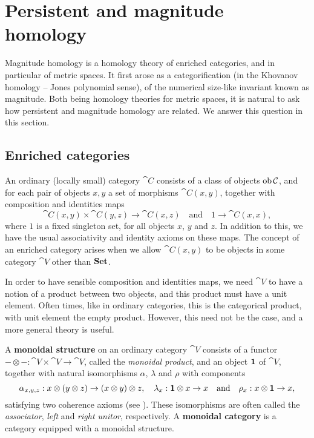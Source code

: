 \section{Persistent and magnitude homology}
Magnitude homology is a homology theory of enriched categories, and in particular of metric spaces. It first arose as a categorification (in the Khovanov homology -- Jones polynomial sense), of the numerical size-like invariant known as magnitude. Both being homology theories for metric spaces, it is natural to ask how persistent and magnitude homology are related. We answer this question in this section.

\subsection{Enriched categories}
An ordinary (locally small) category $\cat{C}$ consists of a class of objects $\operatorname{ob}\mathcal{C}$, and for each pair of objects $x,y$ a set of morphisms $\cat{C}(x,y)$, together with composition and identities maps
\[\cat{C}(x,y) \times \cat{C}(y,z) \to \cat{C}(x,z) \quad \text{and} \quad 1 \to \cat{C}(x,x),\]
where $1$ is a fixed singleton set, for all objects $x$, $y$ and $z$. In addition to this, we have the usual associativity and identity axioms on these maps. The concept of an enriched category arises when we allow $\cat{C}(x,y)$ to be objects in some category $\cat{V}$ other than $\mathbf{Set}$.

In order to have sensible composition and identities maps, we need $\cat{V}$ to have a notion of a product between two objects, and this product must have a unit element. Often times, like in ordinary categories, this is the categorical product, with unit element the empty product. However, this need not be the case, and a more general theory is useful. 
\begin{definition}
    A \textbf{monoidal structure} on an ordinary category $\cat{V}$ consists of a functor $- \otimes - : \cat{V} \times \cat{V} \to \cat{V}$, called the \textit{monoidal product}, and an object $\mathbf{1}$ of $\cat{V}$, together with natural isomorphisms $\alpha$, $\lambda$ and $\rho$ with components
    \[\alpha_{x,y,z} : x \otimes (y \otimes z) \to (x \otimes y) \otimes z, \quad \lambda_x : \mathbf{1} \otimes x \to x \quad \text{and} \quad \rho_x : x \otimes \mathbf{1} \to x,\]
    satisfying two coherence axioms (see \cite[Chapter VII]{MacLane1978}). These isomorphisms are often called the \textit{associator}, \textit{left} and \textit{right unitor}, respectively. A \textbf{monoidal category} is a category equipped with a monoidal structure.
\end{definition}

